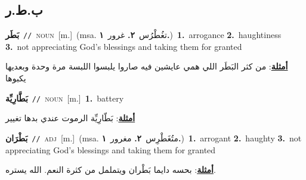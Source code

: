 \documentclass[10pt,a4paper,twoside]{article} %
\begin{document}
\begin{multicols}{2}
\vspace{-3mm}
\subsection*{\color{blue}\foreignlanguage{arabic}{ب.ط.ر}\color{blue}{}} 

{\setlength\topsep{0pt}\textbf{\foreignlanguage{arabic}{بَطَر}}\ {\color{gray}\texttt{//}\color{black}}\ \textsc{noun}\ [m.]\ \color{gray}(msa. \foreignlanguage{arabic}{تغُطْرُس}~\foreignlanguage{arabic}{\textbf{٢.}}  \foreignlanguage{arabic}{غرور}~\foreignlanguage{arabic}{\textbf{١.}})\color{black}\ \textbf{1.}~arrogance  \textbf{2.}~haughtiness  \textbf{3.}~not appreciating God's blessings and taking them for granted\  \begin{flushright}\color{gray}\foreignlanguage{arabic}{\textbf{\underline{\foreignlanguage{arabic}{أمثلة}}}: من كثر البَطَر اللي همي عايشين فيه صاروا يلبسوا اللبسة مرة وحدة وبعديها يكبوها}\end{flushright}\color{black}} \vspace{2mm}

{\setlength\topsep{0pt}\textbf{\foreignlanguage{arabic}{بَطَّارِيِّة}}\ {\color{gray}\texttt{//}\color{black}}\ \textsc{noun}\ [m.]\ \textbf{1.}~battery\  \begin{flushright}\color{gray}\foreignlanguage{arabic}{\textbf{\underline{\foreignlanguage{arabic}{أمثلة}}}: بَطّارِيِّة الرموت عندي بدها تغيير}\end{flushright}\color{black}} \vspace{2mm}

{\setlength\topsep{0pt}\textbf{\foreignlanguage{arabic}{بَطْرَان}}\ {\color{gray}\texttt{//}\color{black}}\ \textsc{adj}\ [m.]\ \color{gray}(msa. \foreignlanguage{arabic}{متُغَطْرِس}~\foreignlanguage{arabic}{\textbf{٢.}}  \foreignlanguage{arabic}{مغرور}~\foreignlanguage{arabic}{\textbf{١.}})\color{black}\ \textbf{1.}~arrogant  \textbf{2.}~haughty  \textbf{3.}~not appreciating God's blessings and taking them for granted\  \begin{flushright}\color{gray}\foreignlanguage{arabic}{\textbf{\underline{\foreignlanguage{arabic}{أمثلة}}}: بحسه دايما بَطْران ويتململ من كثرة النعم. الله يستره.}\end{flushright}\color{black}} \vspace{2mm}


\end{multicols}
\end{document}
